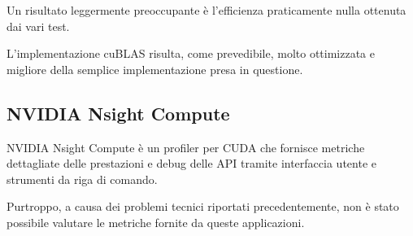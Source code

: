 Un risultato leggermente preoccupante è l'efficienza praticamente nulla ottenuta dai vari test.

L'implementazione cuBLAS risulta, come prevedibile, molto ottimizzata e migliore della semplice implementazione presa in questione.

\subsection{NVIDIA Nsight Compute}

NVIDIA Nsight Compute è un profiler per CUDA che fornisce metriche dettagliate delle prestazioni e debug delle API tramite interfaccia utente e strumenti da riga di comando.

Purtroppo, a causa dei problemi tecnici riportati precedentemente, non è stato possibile valutare le metriche fornite da queste applicazioni.
